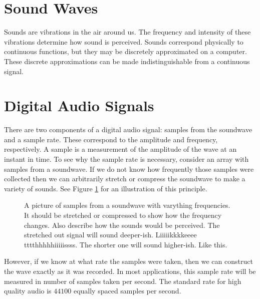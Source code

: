 
\section*{Sound Waves}

Sounds are vibrations in the air around us.
The frequency and intensity of these vibrations determine how sound is perceived.
Sounds correspond physically to continuous functions, but they may be discretely approximated on a computer.
These discrete approximations can be made indistinguishable from a continuous signal.

\section*{Digital Audio Signals}

There are two components of a digital audio signal: samples from the soundwave and a sample rate.
These correspond to the amplitude and frequency, respectively.
A sample is a measurement of the amplitude of the wave at an instant in time.
To see why the sample rate is necessary, consider an array with samples from a soundwave.
If we do not know how frequently those samples were collected then we can arbitrarily stretch or compress the soundwave to make a variety of sounds.
See Figure \ref{fig:comp_wave} for an illustration of this principle.

\begin{center}
\begin{figure}
\caption{A picture of samples from a soundwave with varything frequencies.  It should be stretched or compressed to show how the frequency changes. Also describe how the sounds would be perceived.  The stretched out signal will sound deeper-ish.  Liiiiikkkkeeee tttthhhhhiiiiissss.  The shorter one will sound higher-ish. Like this.}
\label{fig:comp_wave}
\end{figure}
\end{center}

However, if we know at what rate the samples were taken, then we can construct the wave exactly as it was recorded.
In most applications, this sample rate will be measured in number of samples taken per second.
The standard rate for high quality audio is $44100$ equally spaced samples per second.

